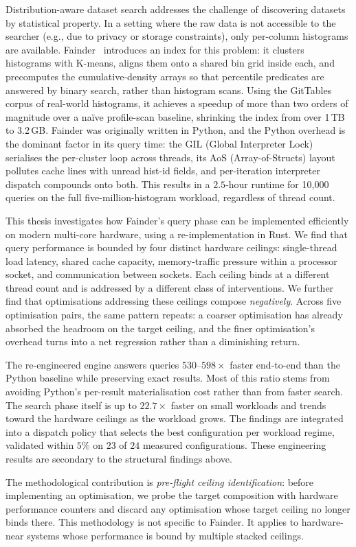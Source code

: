 Distribution-aware dataset search addresses the challenge of discovering datasets by statistical property. In a setting where the raw data is not accessible to the searcher (e.g., due to privacy or storage constraints), only per-column histograms are available. Fainder~\cite{behme_2024} introduces an index for this problem: it clusters histograms with K-means, aligns them onto a shared bin grid inside each, and precomputes the cumulative-density arrays so that percentile predicates are answered by binary search, rather than histogram scans. Using the GitTables corpus of real-world histograms, it achieves a speedup of more than two orders of magnitude over a na\"{i}ve profile-scan baseline, shrinking the index from over 1\,TB to 3.2\,GB. Fainder was originally written in Python, and the Python overhead is the dominant factor in its query time: the GIL (Global Interpreter Lock) serialises the per-cluster loop across threads, its AoS (Array-of-Structs) layout pollutes cache lines with unread hist-id fields, and per-iteration interpreter dispatch compounds onto both. This results in a $2.5$-hour runtime for 10{,}000 queries on the full five-million-histogram workload, regardless of thread count.


This thesis investigates how Fainder's query phase can be implemented efficiently on modern multi-core hardware, using a re-implementation in Rust. We find that query performance is bounded by four distinct hardware ceilings: single-thread load latency, shared cache capacity, memory-traffic pressure within a processor socket, and communication between sockets. Each ceiling binds at a different thread count and is addressed by a different class of interventions. We further find that optimisations addressing these ceilings compose \emph{negatively}. Across five optimisation pairs, the same pattern repeats: a coarser optimisation has already absorbed the headroom on the target ceiling, and the finer optimisation's overhead turns into a net regression rather than a diminishing return.

The re-engineered engine answers queries $530$--$598\times$ faster end-to-end than the Python baseline while preserving exact results. Most of this ratio stems from avoiding Python's per-result materialisation cost rather than from faster search. The search phase itself is up to $22.7\times$ faster on small workloads and trends toward the hardware ceilings as the workload grows. The findings are integrated into a dispatch policy that selects the best configuration per workload regime, validated within $5\%$ on $23$ of $24$ measured configurations. These engineering results are secondary to the structural findings above.

The methodological contribution is \emph{pre-flight ceiling identification}: before implementing an optimisation, we probe the target composition with hardware performance counters and discard any optimisation whose target ceiling no longer binds there. This methodology is not specific to Fainder. It applies to hardware-near systems whose performance is bound by multiple stacked ceilings.